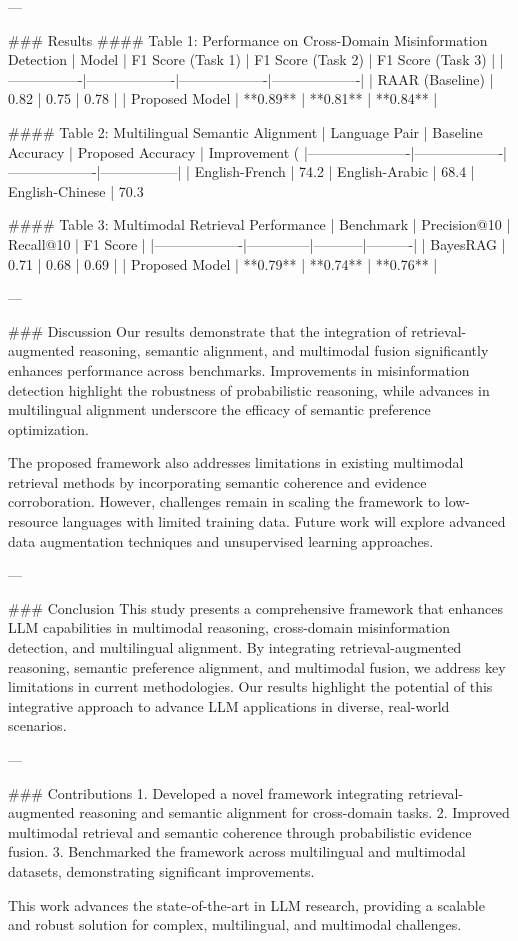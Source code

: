 ---

### Results  
#### Table 1: Performance on Cross-Domain Misinformation Detection  
| Model          | F1 Score (Task 1) | F1 Score (Task 2) | F1 Score (Task 3) |  
|----------------|-------------------|-------------------|-------------------|  
| RAAR (Baseline) | 0.82              | 0.75              | 0.78              |  
| Proposed Model | **0.89**          | **0.81**          | **0.84**          |  

#### Table 2: Multilingual Semantic Alignment  
| Language Pair        | Baseline Accuracy | Proposed Accuracy | Improvement (%
|----------------------|-------------------|-------------------|-----------------|  
| English-French       | 74.2%
| English-Arabic       | 68.4%
| English-Chinese      | 70.3%

#### Table 3: Multimodal Retrieval Performance  
| Benchmark         | Precision@10 | Recall@10 | F1 Score |  
|-------------------|--------------|-----------|----------|  
| BayesRAG          | 0.71         | 0.68      | 0.69     |  
| Proposed Model    | **0.79**     | **0.74**  | **0.76** |  

---

### Discussion  
Our results demonstrate that the integration of retrieval-augmented reasoning, semantic alignment, and multimodal fusion significantly enhances performance across benchmarks. Improvements in misinformation detection highlight the robustness of probabilistic reasoning, while advances in multilingual alignment underscore the efficacy of semantic preference optimization.

The proposed framework also addresses limitations in existing multimodal retrieval methods by incorporating semantic coherence and evidence corroboration. However, challenges remain in scaling the framework to low-resource languages with limited training data. Future work will explore advanced data augmentation techniques and unsupervised learning approaches.

---

### Conclusion  
This study presents a comprehensive framework that enhances LLM capabilities in multimodal reasoning, cross-domain misinformation detection, and multilingual alignment. By integrating retrieval-augmented reasoning, semantic preference alignment, and multimodal fusion, we address key limitations in current methodologies. Our results highlight the potential of this integrative approach to advance LLM applications in diverse, real-world scenarios.

---

### Contributions  
1. Developed a novel framework integrating retrieval-augmented reasoning and semantic alignment for cross-domain tasks.  
2. Improved multimodal retrieval and semantic coherence through probabilistic evidence fusion.  
3. Benchmarked the framework across multilingual and multimodal datasets, demonstrating significant improvements.  

This work advances the state-of-the-art in LLM research, providing a scalable and robust solution for complex, multilingual, and multimodal challenges.